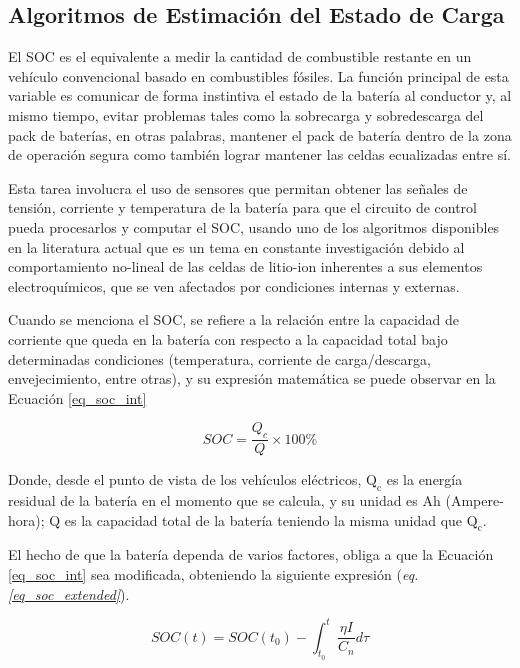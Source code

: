 \documentclass[10pt,a4paper]{article}
\begin{document}
\subsection{Algoritmos de Estimaci\'on del Estado de Carga}\label{algSoc}

\noindent El \acrshort{SOC} es el equivalente a medir la cantidad de combustible
restante en un veh\'iculo convencional basado en combustibles f\'osiles. La
funci\'on principal de esta variable es comunicar de forma instintiva el estado
de la bater\'ia al conductor y, al mismo tiempo, evitar problemas tales como la
sobrecarga y sobredescarga del pack de bater\'ias, en otras palabras, mantener
el pack de bater\'ia dentro de la zona de operaci\'on segura como tambi\'en 
lograr mantener las celdas ecualizadas entre sí.

\noindent Esta tarea involucra el uso de sensores que permitan obtener las
señales de tensi\'on, corriente y temperatura de la bater\'ia para que el
circuito de control pueda procesarlos y computar el \acrshort{SOC},
usando uno de los algoritmos disponibles en la literatura actual que es
un tema en constante investigaci\'on debido al comportamiento no-lineal de las 
celdas de litio-ion inherentes a sus elementos electroqu\'imicos, que se ven 
afectados por condiciones internas y externas.

\noindent Cuando se menciona el \acrshort{SOC}, se refiere a la relaci\'on entre
la capacidad de corriente que queda en la bater\'ia con respecto a la capacidad
total bajo determinadas condiciones (temperatura, corriente de carga/descarga,
envejecimiento, entre otras), y su expresi\'on matem\'atica se puede observar en
la Ecuaci\'on \ref{eq_soc_int}

\begin{equation}
    SOC = \frac{Q_c}{Q}\times100\% 
    \label{eq_soc_int}
\end{equation}

\noindent Donde, desde el punto de vista de los veh\'iculos el\'ectricos,
$\mathrm{Q_c}$ es la energía residual de la bater\'ia en el momento que se
calcula, y su unidad es Ah (Ampere-hora); Q es la capacidad total de la
bater\'ia teniendo la misma unidad que $\mathrm{Q_c}$.

\noindent El hecho de que la bater\'ia dependa de varios factores, obliga a que
la Ecuaci\'on \ref{eq_soc_int} sea modificada, obteniendo la siguiente 
expresi\'on (\emph{eq. \ref{eq_soc_extended}}).

\begin{equation}
    SOC(t) = SOC(t_0) - \int_{t_0}^t \frac{\eta I}{C_n }d\tau
    \label{eq_soc_extended}
\end{equation}
\end{document}
